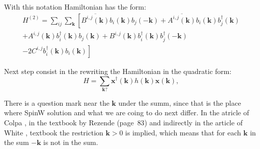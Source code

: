 \documentclass[a4paper,12pt]{article}
\begin{document}
    With this notation Hamiltonian has the form:
    \begin{multline}
        H^{(2)} = \sum_{ij}\sum_{\boldsymbol{k}}\left[\overline{B^{i,j}(\boldsymbol{k})}b_{i}(\boldsymbol{k})b_{j}(-\boldsymbol{k}) +
        \overline{A^{i,j}(\boldsymbol{k})}b_{i}(\boldsymbol{k})b^{\dag}_{j}(\boldsymbol{k})\right. \\+ 
        A^{i,j}(\boldsymbol{k})b^{\dag}_{i}(\boldsymbol{k})b_{j}(\boldsymbol{k}) +
        B^{i,j}(\boldsymbol{k})b^{\dag}_{i}(\boldsymbol{k})b^{\dag}_{j}(-\boldsymbol{k}) \\-
        \left.2 C^{i,j}b^{\dag}_{i}(\boldsymbol{k})b_{i}(\boldsymbol{k})\right]
    \end{multline}

    Next step consist in the rewriting the Hamiltonian in the quadratic form:
    \begin{equation}
        H = \sum_{\boldsymbol{k} ?} \boldsymbol{x}^{\dag}(\boldsymbol{k})h(\boldsymbol{k})\boldsymbol{x}(\boldsymbol{k}),
    \end{equation}
    
    There is a question mark near the $\boldsymbol{k}$ under the summ, since that is the place where SpinW solution and what we are coing to do next differ.
    In the atricle of Colpa \cite{colpa1978diagonalization}, in the textbook by Rezende \cite{rezende2020fundamentals} (page~$83$) 
    and indirectly in the article of White \cite{white1965diagonalization}, textbook \cite{jensen1991rare} the restriction $\boldsymbol{k} > 0$ is implied, 
    which means that for each $\boldsymbol{k}$ in the sum $-\boldsymbol{k}$ is not in the sum.


\end{document}
